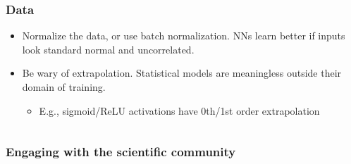 \begin{frame}
    \frametitle{Data}

    \begin{itemize}
        \item<+-> \alert{Normalize the data, or use batch normalization.}
        NNs learn better if inputs look standard normal and uncorrelated.
        \item<+-> \alert{Be wary of extrapolation.}
        Statistical models are meaningless outside their domain of training.
        \begin{itemize}
            \item E.g., sigmoid/ReLU activations have 0th/1st order extrapolation
        \end{itemize}
    \end{itemize}

    \begin{columns}
        \begin{column}{0.4\textwidth}
            \centering
            \footnotesize

        \end{column}

        \begin{column}{0.6\textwidth}
            \centering
            \footnotesize

        \end{column}
    \end{columns}
\end{frame}

\begin{frame}
    \frametitle{Engaging with the scientific community}
\end{frame}

